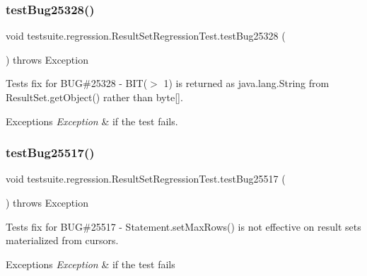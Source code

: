 \subsubsection{\texorpdfstring{test\+Bug25328()}{testBug25328()}}
{\footnotesize\ttfamily void testsuite.\+regression.\+Result\+Set\+Regression\+Test.\+test\+Bug25328 (\begin{DoxyParamCaption}{ }\end{DoxyParamCaption}) throws Exception}

Tests fix for B\+UG\#25328 -\/ B\+I\+T($>$ 1) is returned as java.\+lang.\+String from Result\+Set.\+get\+Object() rather than byte\mbox{[}\mbox{]}.


\begin{DoxyExceptions}{Exceptions}
{\em Exception} & if the test fails. \\
\hline
\end{DoxyExceptions}
\mbox{\label{classtestsuite_1_1regression_1_1_result_set_regression_test_a70caaccac8b8006475747f9481a529af}} 
\subsubsection{\texorpdfstring{test\+Bug25517()}{testBug25517()}}
{\footnotesize\ttfamily void testsuite.\+regression.\+Result\+Set\+Regression\+Test.\+test\+Bug25517 (\begin{DoxyParamCaption}{ }\end{DoxyParamCaption}) throws Exception}

Tests fix for B\+UG\#25517 -\/ Statement.\+set\+Max\+Rows() is not effective on result sets materialized from cursors.


\begin{DoxyExceptions}{Exceptions}
{\em Exception} & if the test fails \\
\hline
\end{DoxyExceptions}
\mbox{\label{classtestsuite_1_1regression_1_1_result_set_regression_test_a0f5956c737c57829a292e224381bffb6}} 
